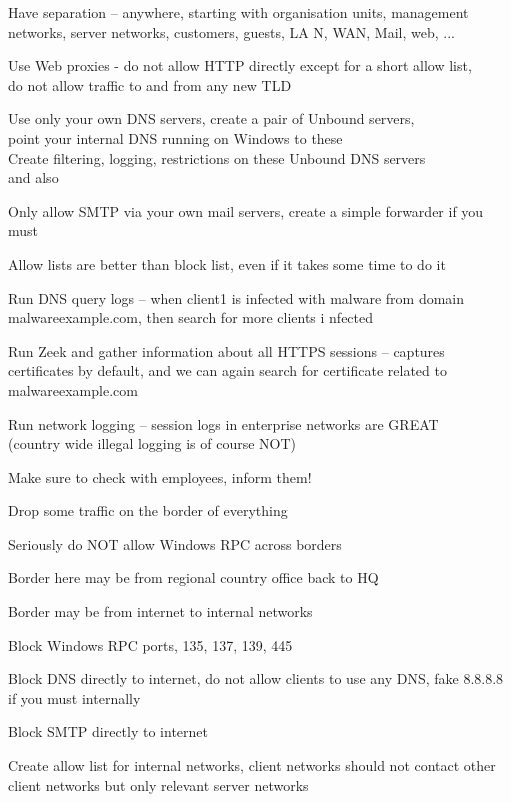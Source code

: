 \documentclass[Screen16to9,17pt]{foils}
\begin{document}
\begin{list2}
\item Have separation -- anywhere, starting with organisation units, management networks, server networks, customers, guests, LA
N, WAN, Mail, web, ...
\item Use Web proxies - do not allow HTTP directly except for a short allow list, \\
do not allow traffic to and from any new TLD
\item Use only your own DNS servers, create a pair of Unbound servers, \\
point your internal DNS running on Windows to these\\
Create filtering, logging, restrictions on these Unbound DNS servers\\
 and also 
\item Only allow SMTP via your own mail servers, create a simple forwarder if you must
\end{list2}

Allow lists are better than block list, even if it takes some time to do it



\begin{list2}
\item Run DNS query logs -- when client1 is infected with malware from domain malwareexample.com, then search for more clients i
nfected
\item Run Zeek and gather information about all HTTPS sessions -- captures certificates by default, and we can again search for
certificate related to malwareexample.com
\item Run network logging -- session logs in enterprise networks are GREAT \\
(country wide illegal logging is of course NOT)
\end{list2}

Make sure to check with employees, inform them!


\begin{list2}
\item Drop some traffic on the border of everything
\item Seriously do NOT allow Windows RPC across borders
\item Border here may be from regional country office back to HQ
\item Border may be from internet to internal networks
\item Block Windows RPC ports, 135, 137, 139, 445
\item Block DNS directly to internet, do not allow clients to use any DNS, fake 8.8.8.8 if you must internally
\item Block SMTP directly to internet
\item Create allow list for internal networks, client networks should not contact other client networks but only relevant server networks
\end{list2}
\end{document}

